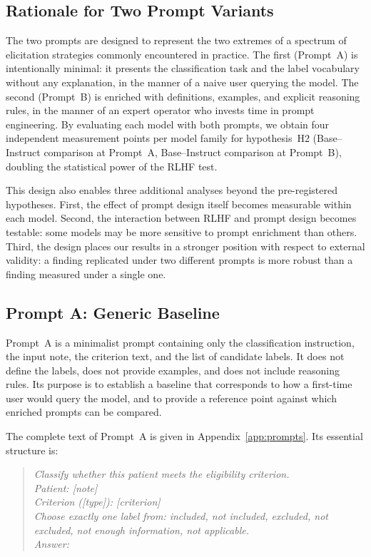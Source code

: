 \subsection{Rationale for Two Prompt Variants}
\label{subsec:met-two-prompts}

The two prompts are designed to represent the two extremes of a spectrum of 
elicitation strategies commonly encountered in practice. The first 
(Prompt~A) is intentionally minimal: it presents the classification task and 
the label vocabulary without any explanation, in the manner of a naive user 
querying the model. The second (Prompt~B) is enriched with definitions, 
examples, and explicit reasoning rules, in the manner of an expert operator 
who invests time in prompt engineering. By evaluating each model with both 
prompts, we obtain four independent measurement points per model family for 
hypothesis~H2 (Base--Instruct comparison at Prompt~A, Base--Instruct 
comparison at Prompt~B), doubling the statistical power of the RLHF test.

This design also enables three additional analyses beyond the pre-registered 
hypotheses. First, the effect of prompt design itself becomes measurable 
within each model. Second, the interaction between RLHF and prompt design 
becomes testable: some models may be more sensitive to prompt enrichment 
than others. Third, the design places our results in a stronger position 
with respect to external validity: a finding replicated under two different 
prompts is more robust than a finding measured under a single one.

\subsection{Prompt A: Generic Baseline}
\label{subsec:met-prompt-a}

Prompt~A is a minimalist prompt containing only the classification 
instruction, the input note, the criterion text, and the list of candidate 
labels. It does not define the labels, does not provide examples, and does 
not include reasoning rules. Its purpose is to establish a baseline that 
corresponds to how a first-time user would query the model, and to provide 
a reference point against which enriched prompts can be compared.

The complete text of Prompt~A is given in Appendix~\ref{app:prompts}. Its 
essential structure is:

\begin{quote}
\itshape
Classify whether this patient meets the eligibility criterion.\\
Patient: \textrm{[note]}\\
Criterion (\textrm{[type]}): \textrm{[criterion]}\\
Choose exactly one label from: included, not included, excluded, 
not excluded, not enough information, not applicable.\\
Answer:
\end{quote}


